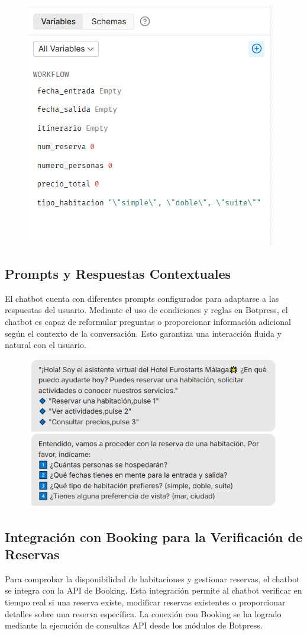 \documentclass[12pt]{article}
\begin{document}
\begin{figure}[h!]
    \centering
    \includegraphics[width=.5\textwidth]{assets/Variables.jpeg}
    \label{fig:my_label}
\end{figure}

\clearpage

\subsection{Prompts y Respuestas Contextuales}

El chatbot cuenta con diferentes prompts configurados para adaptarse a las respuestas del usuario. Mediante el uso de condiciones y reglas en Botpress, 
el chatbot es capaz de reformular preguntas o proporcionar información adicional según el contexto de la conversación. Esto garantiza una interacción 
fluida y natural con el usuario.

\begin{figure}[h!]
    \centering
    \includegraphics[width=.6\textwidth]{assets/Promts.jpeg}
    \label{fig:my_label}
\end{figure}

\subsection{Integración con Booking para la Verificación de Reservas}

Para comprobar la disponibilidad de habitaciones y gestionar reservas, el chatbot se integra con la API de Booking. Esta integración permite al chatbot 
verificar en tiempo real si una reserva existe, modificar reservas existentes o proporcionar detalles sobre una reserva específica. La conexión con 
Booking se ha logrado mediante la ejecución de consultas API desde los módulos de Botpress.
\end{document}
